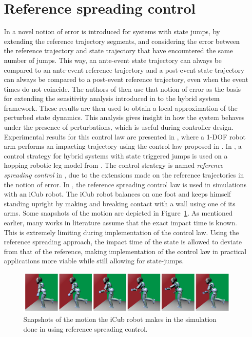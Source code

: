 \documentclass[../DC2017114Bouma.tex]{subfiles}
\begin{document}
\section{Reference spreading control}
In \cite{Saccon2014,Rijnen2015} a novel notion of error is introduced for systems with state jumps, by extending the reference trajectory segments, and considering the error between the reference trajectory and state trajectory that have encountered the same number of jumps. This way, an ante-event state trajectory can always be compared to an ante-event reference trajectory and a post-event state trajectory can always be compared to a post-event reference trajectory, even when the event times do not coincide. The authors of \cite{Saccon2014,Rijnen2015} then use that notion of error as the basis for extending the sensitivity analysis introduced in \cite{Khalil1996} to the hybrid system framework. These results are then used to obtain a local approximation of the perturbed state dynamics. This analysis gives insight in how the system behaves under the presence of perturbations, which is useful during controller design. Experimental results for this control law are presented in \cite{Incremona2015}, where a 1-DOF robot arm performs an impacting trajectory using the control law proposed in \cite{Saccon2014}. In \cite{Rijnen2016}, a control strategy for hybrid systems with state triggered jumps is used on a hopping robotic leg model from \cite{Tsagarakis2013}. The control strategy is named \textit{reference spreading control} in \cite{Rijnen2017}, due to the extensions made on the reference trajectories in the notion of error. In \cite{Rijnen2017a}, the reference spreading control law is used in simulations with an iCub robot. The iCub robot balances on one foot and keeps himself standing upright by making and breaking contact with a wall using one of its arms. Some snapshots of the motion are depicted in Figure~\ref{fig:rijnen2017}. As mentioned earlier, many works in literature assume that the exact impact time is known. This is extremely limiting during implementation of the control law. Using the reference spreading approach, the impact time of the state is allowed to deviate from that of the reference, making implementation of the control law in practical applications more viable while still allowing for state-jumps.

\begin{figure}[H]
\centering
\includegraphics[width=\textwidth]{rijnen2017.PNG}\caption{Snapshots of the motion the iCub robot makes in the simulation done in \cite{Rijnen2017a} using reference spreading control.}\label{fig:rijnen2017}
\end{figure}
\end{document}

